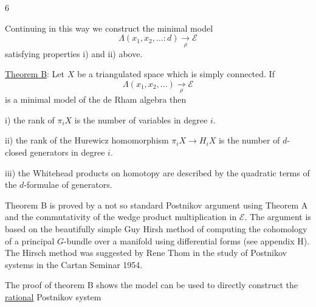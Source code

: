 \begin{flushright}6\end{flushright}

Continuing in this way we construct the minimal model
\[
\Lambda(x_1,x_2,\ldots:d)\underset{\rho}{\longrightarrow}\mathcal E
\]
satisfying properties i) and ii) above.

\uline{Theorem B}: Let $X$ be a triangulated space which is simply connected. If
\[
\Lambda(x_1,x_2,\ldots)\underset{\rho}{\longrightarrow}\mathcal E
\]
is a minimal model of the de Rham algebra then

i) the rank of $\pi_i X$ is the number of variables in degree $i$.

ii) the rank of the Hurewicz homomorphism
$\pi_i X\longrightarrow H_i X$ is the number of $d$-closed generators in degree $i$.

iii) the Whitehead products on homotopy are described by the quadratic terms of the $d$-formulae of generators.

Theorem B is proved by a not so standard Postnikov argument using Theorem A and the commutativity of the wedge product multiplication in $\mathcal E$. The argument is based on the beautifully simple Guy Hirsh method of computing the cohomology of a principal $G$-bundle over a manifold using differential forms (see appendix H). The Hirsch method was suggested by Rene Thom in the study of Postnikov systems in the Cartan Seminar 1954.

The proof of theorem B shows the model can be used to directly construct the \uline{rational} Postnikov system
